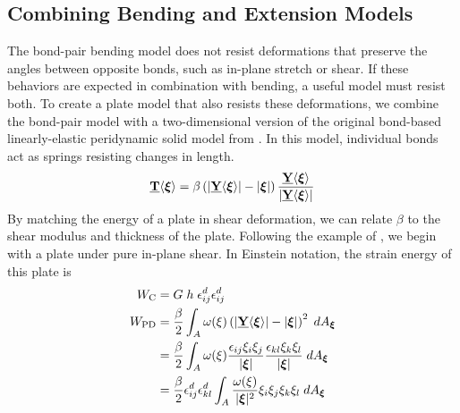 \documentclass[preprint,review,12pt]{elsarticle}
\newcommand\vstate[3]{%
	\mathbf{\underline{#1}}%
	\ifstrempty{#2}{}{[#2]}%
	\ifstrempty{#3}{}{\langle #3 \rangle}}
\begin{document}
\subsection{Combining Bending and Extension Models}
The bond-pair bending model does not resist deformations that preserve the angles between opposite bonds, such as in-plane stretch or shear.
If these behaviors are expected in combination with bending, a useful model must resist both.
To create a plate model that also resists these deformations, we combine the bond-pair model with a two-dimensional version of the original bond-based linearly-elastic peridynamic solid model from \cite{silling2000reformulation}.
In this model, individual bonds act as springs resisting changes in length.
%
\begin{equation}
    \label{eq:bondextension}
    \vstate{T}{}{\boldsymbol{\xi}} =\beta\left(|\vstate{Y}{}{\boldsymbol{\xi}}|-|\boldsymbol{\xi}|\right)\frac{\vstate{Y}{}{\boldsymbol{\xi}}}{|\vstate{Y}{}{\boldsymbol{\xi}}|}
\end{equation}
%
By matching the energy of a plate in shear deformation, we can relate \(\beta\) to the shear modulus and thickness of the plate.
Following the example of \cite{silling2007peridynamic}, we begin with a plate under pure in-plane shear.
In Einstein notation, the strain energy of this plate is
%
%
\begin{align*}
    W_\text{C} &= G \; h \; \epsilon_{ij}^d \epsilon_{ij}^d \\
    W_\text{PD} &= \frac{\beta}{2}\int_A \omega(\xi)\left(|\vstate{Y}{}{\boldsymbol{\xi}}|-|\boldsymbol{\xi}|\right)^2 \; dA_{\boldsymbol{\xi}} \\
    &=\frac{\beta}{2}\int_A  \omega(\xi) \frac{\epsilon_{ij}\xi_i \xi_j }{|\boldsymbol{\xi}|} \frac{\epsilon_{kl} \xi_k \xi_l }{|\boldsymbol{\xi}|}\;dA_{\boldsymbol{\xi}}\\
    &=\frac{\beta}{2} \epsilon_{ij}^d \epsilon_{kl}^d \int_A \frac{ \omega(\xi)}{|\boldsymbol{\xi}|^2}\xi_i \xi_j \xi_k \xi_l \;dA_{\boldsymbol{\xi}}\\
\end{align*}
\end{document}
